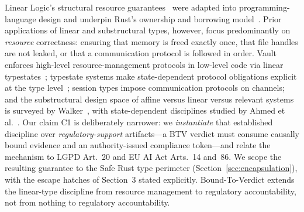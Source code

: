 Linear Logic's structural resource guarantees~\cite{girard1987linear,wadler1991linear}
were adapted into programming-language design and underpin Rust's
ownership and borrowing model~\cite{jung2017rustbelt}.
Prior applications of linear and substructural types, however, focus
predominantly on \emph{resource} correctness: ensuring that memory is
freed exactly once, that file handles are not leaked, or that a
communication protocol is followed in order.  Vault enforces
high-level resource-management protocols in low-level code via
linear typestates~\cite{deline2001vault}; typestate systems make
state-dependent protocol obligations explicit at the type
level~\cite{pierce2002tapl}; session types impose
communication protocols on channels; and the substructural design
space of affine versus linear versus relevant systems is surveyed by
Walker~\cite{walker2005substructural}, with state-dependent
disciplines studied by Ahmed et al.~\cite{ahmed2009state}.
Our claim C1 is deliberately narrower: we \emph{instantiate} that
established discipline over \emph{regulatory-support} artifacts---a
BTV verdict must consume causally bound evidence and an
authority-issued compliance token---and relate the mechanism to LGPD
Art.~20 and EU AI Act Arts.~14 and~86.
We scope the resulting guarantee to the Safe Rust
type perimeter (Section~\ref{sec:encapsulation}), with the escape
hatches of Section~3 stated explicitly.
Bound-To-Verdict extends the linear-type discipline from resource
management to regulatory accountability, not from nothing to
regulatory accountability.
